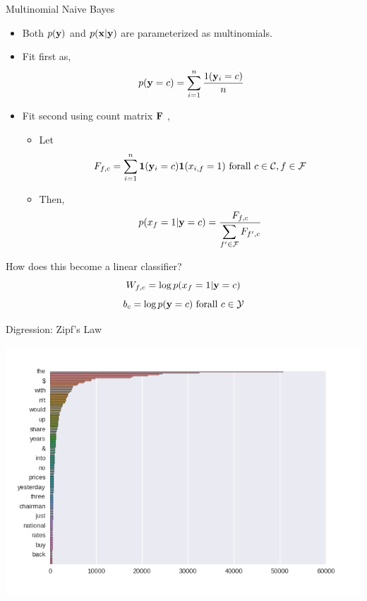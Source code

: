 \documentclass{beamer}
\begin{document}
\begin{frame}{Multinomial Naive Bayes}
  \begin{itemize}
  \item  Both  $p(\mathbf{y})$ and $p(\mathbf{x} | \mathbf{y})$ are
    parameterized as multinomials.
    
  \item Fit first as,
    \[p(\mathbf{y} = c) = \sum_{i = 1}^n \frac{1(\mathbf{y}_i = c)}{n}\]
    \pause

  \item Fit second using count matrix $\mathbf{F}$ ,
    \begin{itemize}
      \item Let \[F_{f,c} = \sum_{i = 1}^n \mathbf{1}(\mathbf{y}_i = c) \mathbf{1}(x_{i, f} = 1) \mathrm{\ for all\ } c\in \mathcal{C}, f\in \mathcal{F}\] 
      \item Then,
      \[p(x_f = 1 | \mathbf{y}=c) = \frac{F_{f, c}}{\displaystyle \sum_{f' \in \mathcal{F}} F_{f',c}}  \]     
    \end{itemize}
  \end{itemize}

\pause
    How does this become a linear classifier? 
  \[ W_{f, c} =  \log p(x_f = 1 | \mathbf{y}=c)  \] 
  \[ b_c = \log p(\mathbf{y}=c)  \mathrm{\ for all\  }c\in \mathcal{Y} \] 

\end{frame}


\begin{frame}{Digression: Zipf's Law}

  \includegraphics[width=\textwidth]{../notebooks/zipf}
\end{frame}
\end{document}
